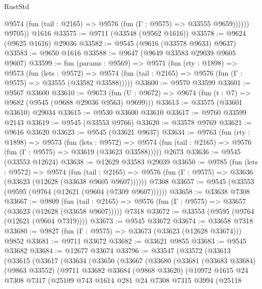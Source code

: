 \begin{lexlean}{RustStd}
\begin{coremodule}
              @9574 (fun (tail : @2165) => @9576 (fun (Γ : @9575) => @33555 @9659))))))
        @9705))
    @1616
@33575 := @9711 (@33548 (@9562 @1616))
@33578 := @9624 (@9625 @1616) @29036
@33582 := @9545 (@9616 (@33578 @9633) @9637)
@33583 := @9650 @1616
@33588 := @9647 (@9649 @33583 @29039 @9605 @9607)
@33599 := fun (params : @9569) =>
  @9571
    (fun (rty : @1898) =>
    @9573
      (fun (lets : @9572) =>
      @9574 (fun (tail : @2165) => @9576 (fun (Γ : @9575) => @33555 (@33582 @33588)))))
@33600 := @9570 @33599
@33601 := @9567 @33600
@33610 := @9673
    (fun (U : @9672) => @9674 (fun (t : @7) => @9682 (@9545 (@9688 @29036 @9563) @9699)))
@33613 := @33575 (@33601 @33610) @29034
@33615 := @9530 @33600 @33610
@33617 := @9760 @33599 @2143
@33619 := @9545 (@33553 @9766)
@33620 := @33578 @9769
@33621 := @9616 @33620
@33623 := @9545 (@33621 @9637)
@33634 := @9763
    (fun (rty : @1898) =>
    @9573
      (fun (lets : @9572) =>
      @9574 (fun (tail : @2165) => @9576 (fun (Γ : @9575) => @33619 (@33623 @33588)))))
    @2673
@33636 := @9545 (@33553 @12624)
@33638 := @12629 @33583 @29039
@33650 := @9785
    (fun (lets : @9572) =>
    @9574
      (fun (tail : @2165) =>
      @9576 (fun (Γ : @9575) => @33636 (@33623 (@12628 (@33638 @9605 @9607))))))
    @7308
@33657 := @9545 (@33553 (@9595 (@9764 (@12621 (@9604 (@7309 @9607))))))
@33658 := @33638 @7308
@33667 := @9809
    (fun (tail : @2165) => @9576 (fun (Γ : @9575) => @33657 (@33623 (@12628 (@33658 @9607)))))
    @7318
@33672 := @33553 (@9595 (@9764 (@12621 (@9604 @7319))))
@33673 := @9545 @33672
@33674 := @33658 @7318
@33680 := @9827 (fun (Γ : @9575) => @33673 (@33623 (@12628 @33674))) @9852
@33681 := @9711 @33672
@33682 := @33621 @9855
@33683 := @9545 @33682
@33684 := @12677 @33674
@33796 := @33547
    (@33572
      (@33613
        (@33615
          (@33617
            (@33634
              (@33650
                (@33667
                  (@33680
                    (@33681
                      (@33683 @33684)
                      (@9863 @33552)
                      (@9711
                        @33682
                        @33684
                        (@9868 @33620)
                        (@10972
                          @1615
                          @24
                          @7308
                          @7317
                          (@25109
                            @743
                            @1614
                            @281
                            @24
                            @7308
                            @7315
                            @3994
                            (@25118

\end{coremodule}
\end{lexlean}
